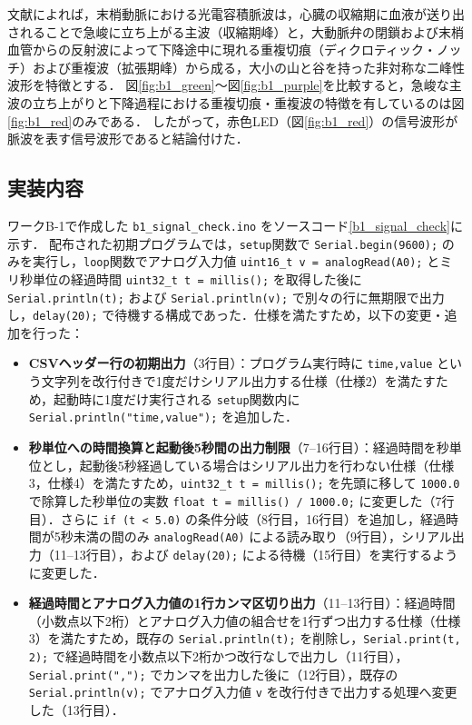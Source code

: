 文献によれば，末梢動脈における光電容積脈波は，心臓の収縮期に血液が送り出されることで急峻に立ち上がる主波（収縮期峰）と，大動脈弁の閉鎖および末梢血管からの反射波によって下降途中に現れる重複切痕（ディクロティック・ノッチ）および重複波（拡張期峰）から成る，大小の山と谷を持った非対称な二峰性波形を特徴とする\cite{elgendi2019use, 安藤譲二1990光電式脈波計測の応用}．
図\ref{fig:b1_green}〜図\ref{fig:b1_purple}を比較すると，急峻な主波の立ち上がりと下降過程における重複切痕・重複波の特徴を有しているのは図\ref{fig:b1_red}のみである．
したがって，赤色LED（図\ref{fig:b1_red}）の信号波形が脈波を表す信号波形であると結論付けた．

\subsection{実装内容}

ワークB-1で作成した \texttt{b1\_signal\_check.ino} をソースコード\ref{b1_signal_check}に示す．
配布された初期プログラムでは，\texttt{setup}関数で \texttt{Serial.begin(9600);} のみを実行し，\texttt{loop}関数でアナログ入力値 \texttt{uint16\_t v = analogRead(A0);} とミリ秒単位の経過時間 \texttt{uint32\_t t = millis();} を取得した後に \texttt{Serial.println(t);} および \texttt{Serial.println(v);} で別々の行に無期限で出力し，\texttt{delay(20);} で待機する構成であった．仕様を満たすため，以下の変更・追加を行った：
\begin{itemize}
  \item \textbf{CSVヘッダー行の初期出力}（3行目）：プログラム実行時に \texttt{time,value} という文字列を改行付きで1度だけシリアル出力する仕様（仕様2）を満たすため，起動時に1度だけ実行される \texttt{setup}関数内に \texttt{Serial.println("time,value");} を追加した．
  \item \textbf{秒単位への時間換算と起動後5秒間の出力制限}（7--16行目）：経過時間を秒単位とし，起動後5秒経過している場合はシリアル出力を行わない仕様（仕様3，仕様4）を満たすため，\texttt{uint32\_t t = millis();} を先頭に移して \texttt{1000.0} で除算した秒単位の実数 \texttt{float t = millis() / 1000.0;} に変更した（7行目）．さらに \texttt{if (t < 5.0)} の条件分岐（8行目，16行目）を追加し，経過時間が5秒未満の間のみ \texttt{analogRead(A0)} による読み取り（9行目），シリアル出力（11--13行目），および \texttt{delay(20);} による待機（15行目）を実行するように変更した．
  \item \textbf{経過時間とアナログ入力値の1行カンマ区切り出力}（11--13行目）：経過時間（小数点以下2桁）とアナログ入力値の組合せを1行ずつ出力する仕様（仕様3）を満たすため，既存の \texttt{Serial.println(t);} を削除し，\texttt{Serial.print(t, 2);} で経過時間を小数点以下2桁かつ改行なしで出力し（11行目），\texttt{Serial.print(",");} でカンマを出力した後に（12行目），既存の \texttt{Serial.println(v);} でアナログ入力値 \texttt{v} を改行付きで出力する処理へ変更した（13行目）．
\end{itemize}

